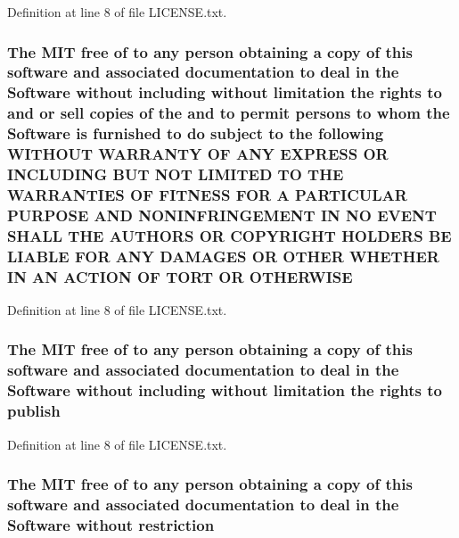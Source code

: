 Definition at line 8 of file L\-I\-C\-E\-N\-S\-E.\-txt.

\hypertarget{LICENSE_8txt_ae4c7c54aef6c135b4520f2237dbcf7c6}{
\subsubsection[{O\-T\-H\-E\-R\-W\-I\-S\-E}]{\setlength{\rightskip}{0pt plus 5cm}The M\-I\-T free of to any person obtaining a {\bf copy} of this software and associated documentation to deal in the {\bf Software} without including without limitation the rights to and or sell copies of the and to permit persons to whom the {\bf Software} is furnished to do subject to the following W\-I\-T\-H\-O\-U\-T W\-A\-R\-R\-A\-N\-T\-Y O\-F A\-N\-Y E\-X\-P\-R\-E\-S\-S O\-R I\-N\-C\-L\-U\-D\-I\-N\-G B\-U\-T N\-O\-T L\-I\-M\-I\-T\-E\-D T\-O T\-H\-E W\-A\-R\-R\-A\-N\-T\-I\-E\-S O\-F F\-I\-T\-N\-E\-S\-S F\-O\-R A P\-A\-R\-T\-I\-C\-U\-L\-A\-R P\-U\-R\-P\-O\-S\-E A\-N\-D N\-O\-N\-I\-N\-F\-R\-I\-N\-G\-E\-M\-E\-N\-T I\-N N\-O E\-V\-E\-N\-T S\-H\-A\-L\-L T\-H\-E A\-U\-T\-H\-O\-R\-S O\-R C\-O\-P\-Y\-R\-I\-G\-H\-T H\-O\-L\-D\-E\-R\-S B\-E L\-I\-A\-B\-L\-E F\-O\-R A\-N\-Y D\-A\-M\-A\-G\-E\-S O\-R O\-T\-H\-E\-R W\-H\-E\-T\-H\-E\-R I\-N A\-N A\-C\-T\-I\-O\-N O\-F T\-O\-R\-T O\-R O\-T\-H\-E\-R\-W\-I\-S\-E}}\label{LICENSE_8txt_ae4c7c54aef6c135b4520f2237dbcf7c6}


Definition at line 8 of file L\-I\-C\-E\-N\-S\-E.\-txt.

\hypertarget{LICENSE_8txt_ae6b6c4d3ae1a4140d31294e27bb0ebd8}{
\subsubsection[{publish}]{\setlength{\rightskip}{0pt plus 5cm}The M\-I\-T free of to any person obtaining a {\bf copy} of this software and associated documentation to deal in the {\bf Software} without including without limitation the rights to publish}}\label{LICENSE_8txt_ae6b6c4d3ae1a4140d31294e27bb0ebd8}


Definition at line 8 of file L\-I\-C\-E\-N\-S\-E.\-txt.

\hypertarget{LICENSE_8txt_ac0e1e4a858a6a19c5392f7f6d29f969c}{
\subsubsection[{restriction}]{\setlength{\rightskip}{0pt plus 5cm}The M\-I\-T free of to any person obtaining a {\bf copy} of this software and associated documentation to deal in the {\bf Software} without restriction}}\label{LICENSE_8txt_ac0e1e4a858a6a19c5392f7f6d29f969c}


